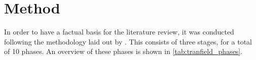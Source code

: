 \section{Method}
\label{sec:Method}




In order to have a factual basis for the literature review, it was conducted following the methodology laid out by \textcite{Tranfield_2003}. This consists of three stages, for a total of 10 phases. An overview of these phases is shown in \autoref{tab:tranfield_phases}.

